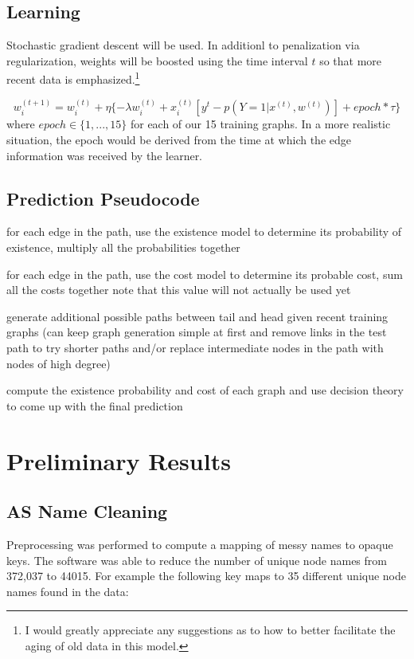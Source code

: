 \documentclass{article} %
\begin{document}
\subsection{Learning}

Stochastic gradient descent will be used.  In additionl to penalization via
regularization, weights will be boosted using the time interval $t$ so that more
recent data is emphasized.\footnote{I would greatly appreciate any
  suggestions as to how to better facilitate the aging of old data in this model.}

\begin{displaymath}
w_i^{(t+1)} = w_i^{(t)} + \eta \{- \lambda w_i^{(t)} + x_i^{(t)} [ y^t -  p(Y=1|x^{(t)},w^{(t)})] + epoch*\tau \}
\end{displaymath}
where $epoch \in \{ 1,...,15 \}$ for each of our 15 training graphs.  In a more realistic situation, the epoch would be derived from the time at
which the edge information was received by the learner.

\subsection{Prediction Pseudocode}

for each edge in the path, use the existence model to determine its probability of existence, multiply all the probabilities together

for each edge in the path, use the cost model to determine its probable cost, sum all the costs together note that this value will not actually be used yet

generate additional possible paths between tail and head given recent training graphs (can keep graph generation simple at first and remove links in the test path to try shorter paths and/or replace intermediate nodes in the path with nodes of high degree) 

compute the existence probability and cost of each graph and use decision theory to come up with the final prediction

\section{Preliminary Results}

\subsection{AS Name Cleaning}

Preprocessing was performed to compute a mapping of messy names to opaque
keys.  The software was able to reduce the number of unique node names from
372,037 to 44015. For example the following key maps to 35 different unique node names
found in the data:
\end{document}
